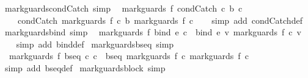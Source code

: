 \begin{isabellebody}
\endisatagproof
{\isafoldproof}%
%
\isadelimproof
\isanewline
%
\endisadelimproof
\isanewline
{}\isamarkupfalse%
\ mark{\isacharunderscore}guards{\isacharunderscore}condCatch\ {\isacharbrackleft}simp{\isacharbrackright}{\isacharcolon}\isanewline
\ \ {\isachardoublequoteopen}mark{\isacharunderscore}guards\ f\ {\isacharparenleft}condCatch\ c{}\ b\ c{}{\isacharparenright}\ {\isacharequal}\ \isanewline
\ \ \ \ condCatch\ {\isacharparenleft}mark{\isacharunderscore}guards\ f\ c{}{\isacharparenright}\ b\ {\isacharparenleft}mark{\isacharunderscore}guards\ f\ c{}{\isacharparenright}{\isachardoublequoteclose}\isanewline
%
\isadelimproof
\ \ %
\endisadelimproof
%
\isatagproof
{}\isamarkupfalse%
\ {\isacharparenleft}simp\ add{\isacharcolon}\ condCatch{\isacharunderscore}def{\isacharparenright}%
\endisatagproof
{\isafoldproof}%
%
\isadelimproof
\isanewline
%
\endisadelimproof
\isanewline
{}\isamarkupfalse%
\ mark{\isacharunderscore}guards{\isacharunderscore}bind\ {\isacharbrackleft}simp{\isacharbrackright}{\isacharcolon}\isanewline
\ \ {\isachardoublequoteopen}mark{\isacharunderscore}guards\ f\ {\isacharparenleft}bind\ e\ c{\isacharparenright}\ {\isacharequal}\ bind\ e\ {\isacharparenleft}{\isasymlambda}v{\isachardot}\ mark{\isacharunderscore}guards\ f\ {\isacharparenleft}c\ v{\isacharparenright}{\isacharparenright}{\isachardoublequoteclose}\isanewline
%
\isadelimproof
\ \ %
\endisadelimproof
%
\isatagproof
{}\isamarkupfalse%
\ {\isacharparenleft}simp\ add{\isacharcolon}\ bind{\isacharunderscore}def{\isacharparenright}%
\endisatagproof
{\isafoldproof}%
%
\isadelimproof
\isanewline
%
\endisadelimproof
\isanewline
{}\isamarkupfalse%
\ mark{\isacharunderscore}guards{\isacharunderscore}bseq\ {\isacharbrackleft}simp{\isacharbrackright}{\isacharcolon}\isanewline
\ \ {\isachardoublequoteopen}mark{\isacharunderscore}guards\ f\ {\isacharparenleft}bseq\ c{}\ c{}{\isacharparenright}\ {\isacharequal}\ bseq\ {\isacharparenleft}mark{\isacharunderscore}guards\ f\ c{}{\isacharparenright}\ {\isacharparenleft}mark{\isacharunderscore}guards\ f\ c{}{\isacharparenright}{\isachardoublequoteclose}\isanewline
%
\isadelimproof
\ \ %
\endisadelimproof
%
\isatagproof
{}\isamarkupfalse%
\ {\isacharparenleft}simp\ add{\isacharcolon}\ bseq{\isacharunderscore}def{\isacharparenright}%
\endisatagproof
{\isafoldproof}%
%
\isadelimproof
\isanewline
%
\endisadelimproof
\isanewline
{}\isamarkupfalse%
\ mark{\isacharunderscore}guards{\isacharunderscore}block\ {\isacharbrackleft}simp{\isacharbrackright}{\isacharcolon}\isanewline

\end{isabellebody}
